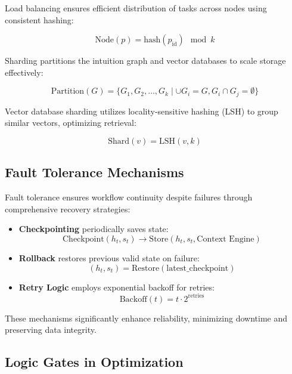 \documentclass[11pt,a4paper]{article}
\begin{document}
Load balancing ensures efficient distribution of tasks across nodes using consistent hashing:

\[
\text{Node}(p)=\text{hash}(p_{\text{id}})\mod k
\]

Sharding partitions the intuition graph and vector databases to scale storage effectively:

\[
\text{Partition}(G)=\{G_1,G_2,\dots,G_k\mid\cup G_i=G, G_i\cap G_j=\emptyset\}
\]

Vector database sharding utilizes locality-sensitive hashing (LSH) to group similar vectors, optimizing retrieval:

\[
\text{Shard}(v)=\text{LSH}(v,k)
\]

\subsection{Fault Tolerance Mechanisms}
\label{subsec:fault_tolerance}

Fault tolerance ensures workflow continuity despite failures through comprehensive recovery strategies:

\begin{itemize}
    \item \textbf{Checkpointing} periodically saves state:
    \[
    \text{Checkpoint}(h_t,s_t)\rightarrow\text{Store}(h_t,s_t,\text{Context Engine})
    \]

    \item \textbf{Rollback} restores previous valid state on failure:
    \[
    (h_t,s_t)=\text{Restore}(\text{latest\_checkpoint})
    \]

    \item \textbf{Retry Logic} employs exponential backoff for retries:
    \[
    \text{Backoff}(t)=t\cdot2^{\text{retries}}
    \]
\end{itemize}

These mechanisms significantly enhance reliability, minimizing downtime and preserving data integrity.

\subsection{Logic Gates in Optimization}
\label{subsec:optimization_gates}
\end{document}
